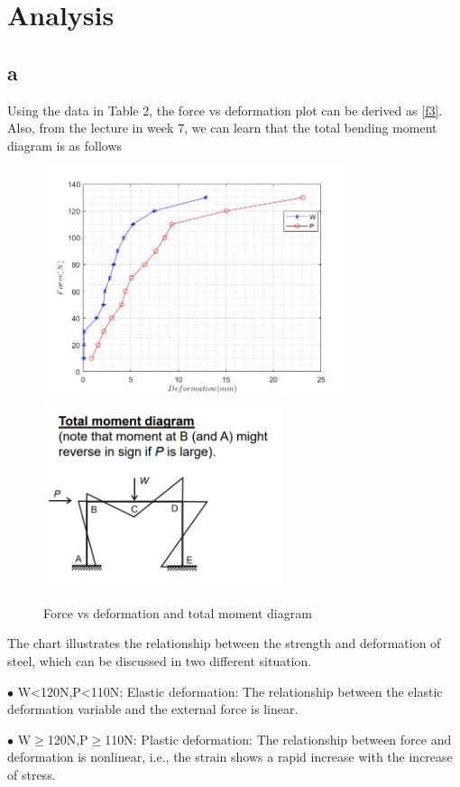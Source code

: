 \section{Analysis}
\FloatBarrier %

\subsection*{a}
Using the data in Table 2, the force vs deformation plot can be derived as \autoref{f3}. Also, from the lecture in week 7, we can learn that the total bending moment diagram is as follows


\begin{figure}[htbp]
    \centering
    \includegraphics[width=9cm]{./fig/17.jpg}
    \includegraphics[width=7cm]{./fig/16.png}
    \caption{Force vs deformation and total moment diagram}
    \label{f3}
\end{figure}


The chart illustrates the relationship between the strength and deformation of steel, which can be discussed in two different situation.

$\bullet$ W<120N,P<110N: Elastic deformation: The relationship between the elastic deformation variable and the external force is linear.

$\bullet$ W$\geq$120N,P$\geq$110N: Plastic deformation: The relationship between force and deformation is nonlinear, i.e., the strain shows a rapid increase with the increase of stress.

